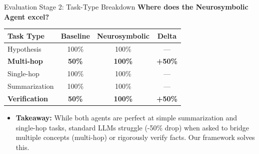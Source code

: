 \documentclass{beamer}
\begin{document}
\begin{frame}{Evaluation Stage 2: Task-Type Breakdown}
    \textbf{Where does the Neurosymbolic Agent excel?}
    
    \vspace{0.3cm}
    \begin{table}[]
        \centering
        \begin{tabular}{lccc}
            \toprule
            \textbf{Task Type} & \textbf{Baseline} & \textbf{Neurosymbolic} & \textbf{Delta} \\
            \midrule
            Hypothesis & 100\% & 100\% & --- \\
            \textbf{Multi-hop} & \textbf{50\%} & \textbf{100\%} & \textcolor{green!60!black}{\textbf{+50\%}} \\
            Single-hop & 100\% & 100\% & --- \\
            Summarization & 100\% & 100\% & --- \\
            \textbf{Verification} & \textbf{50\%} & \textbf{100\%} & \textcolor{green!60!black}{\textbf{+50\%}} \\
            \bottomrule
        \end{tabular}
    \end{table}
    \begin{itemize}
        \item \textbf{Takeaway:} While both agents are perfect at simple summarization and single-hop tasks, standard LLMs struggle (-50\% drop) when asked to bridge multiple concepts (multi-hop) or rigorously verify facts. Our framework solves this.
    \end{itemize}
\end{frame}
\end{document}

